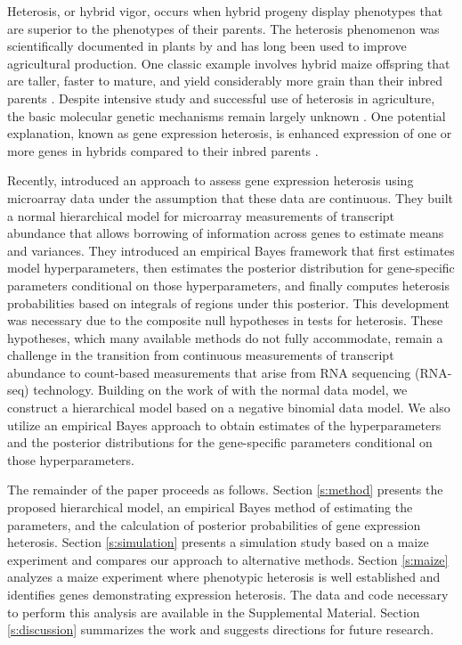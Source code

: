 \documentclass[useAMS,usenatbib,referee]{biom}
\newcommand{\RNAseq}{RNA-seq}
\begin{document}
Heterosis, or hybrid vigor, occurs when hybrid progeny display phenotypes that are superior to the phenotypes of their parents.  The heterosis phenomenon was scientifically documented in plants by \cite{darwin1876effects} and has long been used to improve agricultural production.  One classic example involves hybrid maize offspring that are taller, faster to mature, and yield considerably more grain than their inbred parents \citep{hallauer1981quantitative, hallauer2010quantitative}.  Despite intensive study and successful use of heterosis in agriculture, the basic molecular genetic mechanisms remain largely unknown \citep{coors1999genetics, lippman2007heterosis}. One potential explanation, known as gene expression heterosis, is enhanced expression of one or more genes in hybrids compared to their inbred parents \citep{swanson2006all, springer2007allelic}.

Recently, \cite{ji2014estimation} introduced an approach to assess gene expression heterosis using microarray data under the assumption that these data are continuous. They built a normal hierarchical model for microarray measurements of transcript abundance that allows borrowing of information across genes to estimate means and variances. They introduced an empirical Bayes framework that first estimates model hyperparameters, then estimates the posterior distribution for gene-specific parameters conditional on those hyperparameters, and finally computes heterosis probabilities based on integrals of regions under this posterior. This development was necessary due to the composite null hypotheses in tests for heterosis. These hypotheses, which many available methods do not fully accommodate, remain a challenge in the transition from continuous measurements of transcript abundance to count-based measurements that arise from RNA sequencing (\RNAseq{}) technology. Building on the work of \citeauthor{ji2014estimation} with the normal data model, we construct a hierarchical model based on a negative binomial data model. We also utilize an empirical Bayes approach to obtain estimates of the hyperparameters and the posterior distributions for the gene-specific parameters conditional on those hyperparameters. 

The remainder of the paper proceeds as follows. Section \ref{s:method} presents the proposed hierarchical model, an empirical Bayes method of estimating the parameters, and the calculation of posterior probabilities of gene expression heterosis. Section \ref{s:simulation} presents a simulation study based on a maize experiment and compares our approach to alternative methods. Section \ref{s:maize} analyzes a maize experiment where phenotypic heterosis is well established and identifies genes demonstrating expression heterosis. The data and code necessary to perform this analysis are available in the Supplemental Material. Section \ref{s:discussion} summarizes the work and suggests directions for future research.
\end{document}
